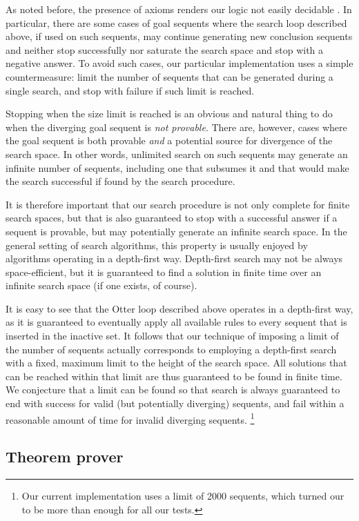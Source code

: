 As noted before, the presence of axioms renders our logic not easily decidable
\cite{mell-dec}. In particular, there are some cases of goal sequents where the
search loop described above, if used on such sequents, may continue generating
new conclusion sequents and neither stop successfully nor saturate the search
space and stop with a negative answer. To avoid such cases, our particular
implementation uses a simple countermeasure: limit the number of sequents that
can be generated during a single search, and stop with failure if such limit is
reached.

Stopping when the size limit is reached is an obvious and natural thing to do
when the diverging goal sequent is \emph{not provable}.
There are, however, cases where the goal sequent is both provable \emph{and}
a potential source for divergence of the search space. In other words, unlimited
search on such sequents may generate an infinite number of sequents, including
one that subsumes it and that would make the search successful if found by the
search procedure.

It is therefore important that our search procedure is not only complete for
finite search spaces, but that is also guaranteed to stop with a successful
answer if a sequent is provable, but may potentially generate an infinite search
space. In the general setting of search algorithms, this property is usually
enjoyed by algorithms operating in a depth-first way. Depth-first search may not
be always space-efficient, but it is guaranteed to find a solution in finite
time over an infinite search space (if one exists, of course).

It is easy to see that the Otter loop described above operates in a depth-first
way, as it is guaranteed to eventually apply all available rules to every
sequent that is inserted in the inactive set. It follows that our technique of
imposing a limit of the number of sequents actually corresponds to employing a
depth-first search with a fixed, maximum limit to the height of the search
space. All solutions that can be reached within that limit are thus guaranteed
to be found in finite time. We conjecture that a limit can be found so that
search is always guaranteed to end with success for valid (but potentially
diverging) sequents, and fail within a reasonable amount of time for invalid
diverging sequents.
\footnote{Our current implementation uses a limit of 2000 sequents, which turned
  our to be more than enough for all our tests.}

\subsection{Theorem prover}

